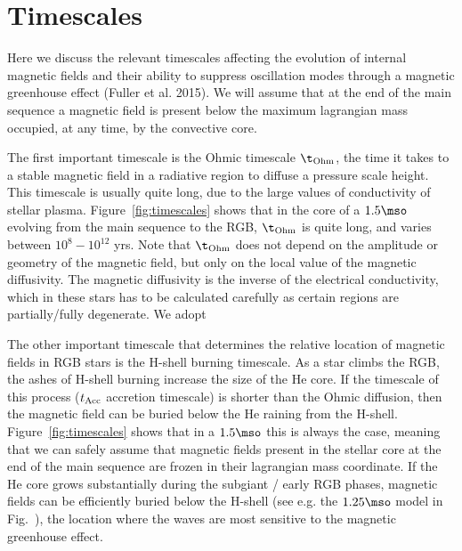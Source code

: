 \section{Timescales}
\label{time}
Here we discuss the relevant timescales affecting the evolution of internal magnetic fields and their ability to 
suppress oscillation modes through a magnetic greenhouse effect (Fuller et al. 2015).
We will assume that at the end of the main sequence a magnetic field is present below the maximum lagrangian mass occupied, at any time, by the convective core.

The first important timescale is the Ohmic timescale $\t_{\rm Ohm}$, the time it takes to a stable magnetic field in a radiative region to diffuse a pressure scale height. This timescale is usually quite long, due to the large values of conductivity of stellar plasma. Figure~\ref{fig:timescales} shows that in the core of a $1.5\mso$ evolving from the main sequence to the RGB,  $\t_{\rm Ohm}$ is quite long, and varies between $10^8-10^12$ yrs. Note that  $\t_{\rm Ohm}$ does not depend on the amplitude or geometry of the magnetic field, but only on the local value of the magnetic diffusivity. The magnetic diffusivity is the inverse of the electrical conductivity,  which in these stars has to be calculated carefully as certain regions are partially/fully degenerate. We adopt

The other important timescale that determines the relative location of magnetic fields in  RGB stars is the H-shell burning timescale. As a star climbs the RGB, the ashes of H-shell burning increase the size of the He core. If the timescale of this process ($t_{\rm Acc}$ accretion timescale)  is shorter than the Ohmic diffusion, then the magnetic field can be buried below the He raining from the H-shell. Figure~\ref{fig:timescales} shows that in a $1.5\mso$ this is always the case, meaning that 
we can safely assume that magnetic fields present in the stellar core at the end of the main sequence are frozen in their lagrangian mass coordinate. If the He core grows substantially during the subgiant / early RGB phases, magnetic fields can be efficiently buried below the H-shell (see e.g. the $1.25\mso$ model in Fig.~\label{fig:DipoleHist}), the location where the waves are most sensitive to the magnetic greenhouse effect. 

